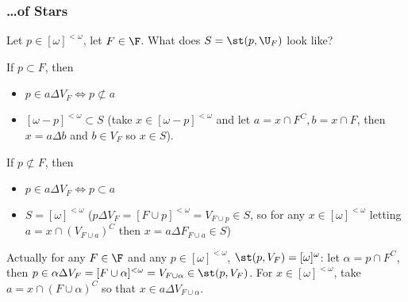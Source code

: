 \documentclass{article}
\begin{document}
\subsubsection*{\dots of Stars}

Let \(p \in [\omega]^{<\omega}\), let \(F \in \F\). What does \(S =\st(p, \U_F)\) look like?

If \(p \subset F\), then
\begin{itemize}
    \item \( p \in a\Delta V_F \iff p \not \subset a\)
    \item \([\omega- p]^{<\omega} \subset S\) (take \(x \in [\omega- p]^{<\omega}\) and let \(a = x\cap F^C, b = x\cap F\), then \(x = a\Delta b\) and \(b \in V_F\) so \(x \in S\)).
\end{itemize}
If \(p \not\subset F\), then
\begin{itemize}
    \item \( p \in a\Delta V_F \iff p \subset a\)
    \item \(S = [\omega]^{<\omega}\) (\(p\Delta V_F = [F\cup p]^{<\omega} = V_{F\cup p} \in S\), so for any \(x \in [\omega]^{<\omega}\) letting \(a = x\cap (V_{F\cup a})^C\) then \(x = a\Delta F_{F\cup a} \in S\))
\end{itemize}
Actually for any \(F \in \F\) and any \(p \in [\omega]^{<\omega}\), \(\st(p, V_F) = [\omega]^{\omega}\): let \(\alpha = p \cap F^C\), then \(p \in \alpha\Delta V_F =[F\cup\alpha]^{<\omega} = V_{F\cup\alpha} \in \st(p, V_F)\). For \(x\in [\omega]^{<\omega}\), take \(a = x \cap (F\cup\alpha)^C\) so that \(x \in a\Delta V_{F\cup\alpha}\).
\end{document}
